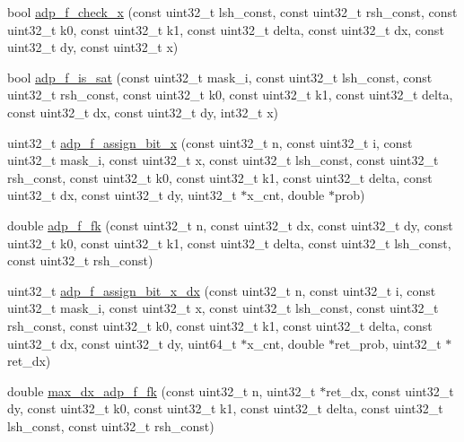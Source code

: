 \begin{DoxyCompactItemize}
\item 
bool \hyperlink{adp-tea-f-fk_8cc_a0f6202112f8d6e5030468311d4dfe5b0}{adp\-\_\-f\-\_\-check\-\_\-x} (const uint32\-\_\-t lsh\-\_\-const, const uint32\-\_\-t rsh\-\_\-const, const uint32\-\_\-t k0, const uint32\-\_\-t k1, const uint32\-\_\-t delta, const uint32\-\_\-t dx, const uint32\-\_\-t dy, const uint32\-\_\-t x)
\item 
bool \hyperlink{adp-tea-f-fk_8cc_a08aeb7cc83aaf6bd1f9a3758f45112b4}{adp\-\_\-f\-\_\-is\-\_\-sat} (const uint32\-\_\-t mask\-\_\-i, const uint32\-\_\-t lsh\-\_\-const, const uint32\-\_\-t rsh\-\_\-const, const uint32\-\_\-t k0, const uint32\-\_\-t k1, const uint32\-\_\-t delta, const uint32\-\_\-t dx, const uint32\-\_\-t dy, int32\-\_\-t x)
\item 
uint32\-\_\-t \hyperlink{adp-tea-f-fk_8cc_aeaf46be11e7c500a368d08cf6f32acb6}{adp\-\_\-f\-\_\-assign\-\_\-bit\-\_\-x} (const uint32\-\_\-t n, const uint32\-\_\-t i, const uint32\-\_\-t mask\-\_\-i, const uint32\-\_\-t x, const uint32\-\_\-t lsh\-\_\-const, const uint32\-\_\-t rsh\-\_\-const, const uint32\-\_\-t k0, const uint32\-\_\-t k1, const uint32\-\_\-t delta, const uint32\-\_\-t dx, const uint32\-\_\-t dy, uint32\-\_\-t $\ast$x\-\_\-cnt, double $\ast$prob)
\item 
double \hyperlink{adp-tea-f-fk_8cc_a197140aa874649bb8dc119db47f6b139}{adp\-\_\-f\-\_\-fk} (const uint32\-\_\-t n, const uint32\-\_\-t dx, const uint32\-\_\-t dy, const uint32\-\_\-t k0, const uint32\-\_\-t k1, const uint32\-\_\-t delta, const uint32\-\_\-t lsh\-\_\-const, const uint32\-\_\-t rsh\-\_\-const)
\item 
uint32\-\_\-t \hyperlink{adp-tea-f-fk_8cc_aa85b9197280f9256f76aac08b5e2ea0c}{adp\-\_\-f\-\_\-assign\-\_\-bit\-\_\-x\-\_\-dx} (const uint32\-\_\-t n, const uint32\-\_\-t i, const uint32\-\_\-t mask\-\_\-i, const uint32\-\_\-t x, const uint32\-\_\-t lsh\-\_\-const, const uint32\-\_\-t rsh\-\_\-const, const uint32\-\_\-t k0, const uint32\-\_\-t k1, const uint32\-\_\-t delta, const uint32\-\_\-t dx, const uint32\-\_\-t dy, uint64\-\_\-t $\ast$x\-\_\-cnt, double $\ast$ret\-\_\-prob, uint32\-\_\-t $\ast$ret\-\_\-dx)
\item 
double \hyperlink{adp-tea-f-fk_8cc_a51a32e1be5232b4b96d539b64171009a}{max\-\_\-dx\-\_\-adp\-\_\-f\-\_\-fk} (const uint32\-\_\-t n, uint32\-\_\-t $\ast$ret\-\_\-dx, const uint32\-\_\-t dy, const uint32\-\_\-t k0, const uint32\-\_\-t k1, const uint32\-\_\-t delta, const uint32\-\_\-t lsh\-\_\-const, const uint32\-\_\-t rsh\-\_\-const)

\end{DoxyCompactItemize}
